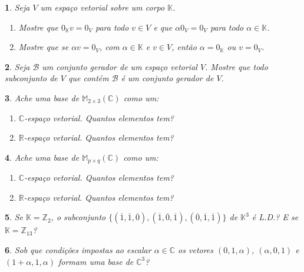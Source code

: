 \documentclass[12pt]{exam}
\newtheorem{exercicio}{}
\newcommand{\integer}{\mathbb{Z}}
\newcommand{\real}{\mathbb{R}}
\newcommand{\complex}{\mathbb{C}}
\newcommand{\cp}[1]{\mathbb{#1}}
\begin{document}
\begin{exercicio}
  Seja $V$ um espa\c{c}o vetorial sobre um corpo $\cp{K}$.
  \begin{enumerate}[label={\alph*})]
    \item Mostre que $0_\cp{K} v = 0_V$ para todo $v \in V$ e que $\alpha 0_V = 0_V$ para todo $\alpha \in \cp{K}$.
    \item Mostre que se $\alpha v = 0_V$, com $\alpha \in \cp{K}$ e $v \in V$, ent\~ao $\alpha = 0_\cp{K}$ ou $v = 0_V$.
  \end{enumerate}
\end{exercicio}

\begin{exercicio}
Seja $\mathcal{B}$ um conjunto gerador de um espa\c{c}o vetorial $V$. Mostre que todo subconjunto de $V$ que cont\'em $\mathcal{B}$ \'e um conjunto gerador de $V$.
\end{exercicio}

\begin{exercicio}
  Ache uma base de $\cp{M}_{2 \times 3}(\complex)$ como um:
  \begin{enumerate}[label={\alph*})]
     \item $\complex$-espa\c{c}o vetorial. Quantos elementos tem?
     \item $\real$-espa\c{c}o vetorial. Quantos elementos tem?
   \end{enumerate}
\end{exercicio}

\begin{exercicio}
  Ache uma base de $\cp{M}_{p \times q}(\complex)$ como um:
  \begin{enumerate}[label={\alph*})]
     \item $\complex$-espa\c{c}o vetorial. Quantos elementos tem?
     \item $\real$-espa\c{c}o vetorial. Quantos elementos tem?
   \end{enumerate}
\end{exercicio}

\begin{exercicio}
  Se $\cp{K} = \integer_2$, o subconjunto $\{(\overline{1}, \overline{1}, \overline{0}), (\overline{1}, \overline{0}, \overline{1}), (\overline{0}, \overline{1}, \overline{1})\}$ de $\cp{K}^3$ \'e L.D.? E se $\cp{K} = \integer_{13}$?
\end{exercicio}

\begin{exercicio}
  Sob que condi\c{c}\~oes impostas ao escalar $\alpha \in \complex$ os vetores $(0,1,\alpha)$, $(\alpha,0,1)$ e $(1 + \alpha, 1, \alpha)$ formam uma base de $\complex^3$?
\end{exercicio}
\end{document}
